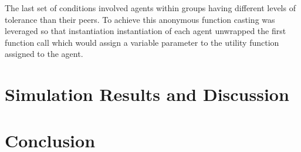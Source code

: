 \documentclass[sigplan,nonacm]{acmart}
\begin{document}
The last set of conditions involved agents within groups having different levels of tolerance than their peers.
To achieve this anonymous function casting was leveraged so that instantiation instantiation of each agent
unwrapped the first function call which would assign a variable parameter to the utility function assigned to the agent.

\section{Simulation Results and Discussion}



\section{Conclusion}




\end{document}
